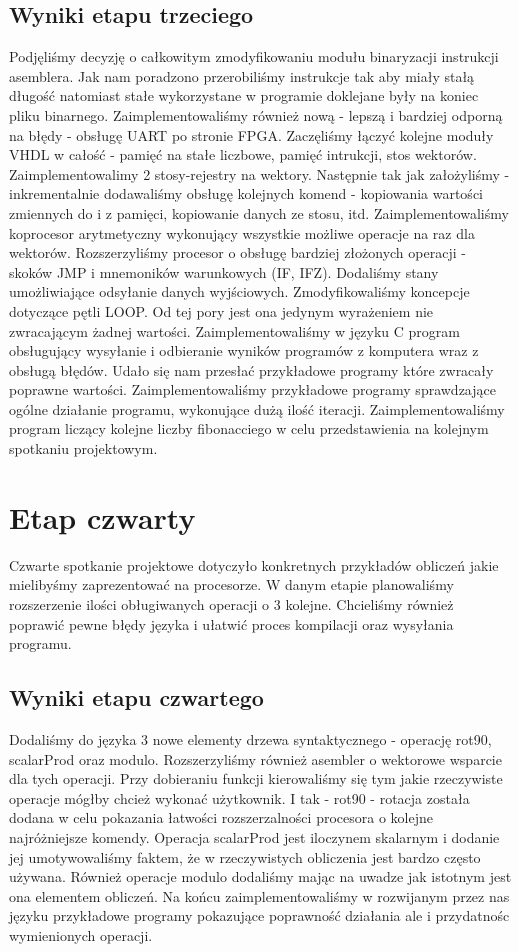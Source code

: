 \subsection{Wyniki etapu trzeciego}
Podjęliśmy decyzję o całkowitym zmodyfikowaniu modułu binaryzacji instrukcji asemblera. Jak nam poradzono przerobiliśmy instrukcje tak aby miały stałą długość natomiast stałe wykorzystane w programie doklejane były na koniec pliku binarnego. Zaimplementowaliśmy również nową - lepszą i bardziej odporną na błędy -  obsługę UART po stronie FPGA. Zaczęliśmy łączyć kolejne moduły VHDL w całość - pamięć na stałe liczbowe, pamięć intrukcji, stos wektorów. Zaimplementowalimy 2 stosy-rejestry na wektory. Następnie tak jak założyliśmy - inkrementalnie dodawaliśmy obsługę kolejnych komend - kopiowania wartości zmiennych do i z pamięci, kopiowanie danych ze stosu, itd. Zaimplementowaliśmy koprocesor arytmetyczny wykonujący wszystkie możliwe operacje na raz dla wektorów. Rozszerzyliśmy procesor o obsługę bardziej złożonych operacji - skoków JMP i mnemoników warunkowych (IF, IFZ). Dodaliśmy stany umożliwiające odsyłanie danych wyjściowych. Zmodyfikowaliśmy koncepcje dotyczące pętli LOOP. Od tej pory jest ona jedynym wyrażeniem nie zwracającym żadnej wartości. Zaimplementowaliśmy w języku C program obsługujący wysyłanie i odbieranie wyników programów z komputera wraz z obsługą błędów. Udało się nam przesłać przykładowe programy które zwracały poprawne wartości. Zaimplementowaliśmy przykładowe programy sprawdzające ogólne działanie programu, wykonujące dużą ilość iteracji. Zaimplementowaliśmy program liczący kolejne liczby fibonacciego w celu przedstawienia na kolejnym spotkaniu projektowym.
\section{Etap czwarty}
Czwarte spotkanie projektowe dotyczyło konkretnych przykładów obliczeń jakie mielibyśmy zaprezentować na procesorze. W danym etapie planowaliśmy rozszerzenie ilości obługiwanych operacji o 3 kolejne. Chcieliśmy również poprawić pewne błędy języka i ułatwić proces kompilacji oraz wysyłania programu. 
\subsection{Wyniki etapu czwartego}
Dodaliśmy do języka 3 nowe elementy drzewa syntaktycznego - operację rot90, scalarProd oraz modulo. Rozszerzyliśmy również asembler o wektorowe wsparcie dla tych operacji. Przy dobieraniu funkcji kierowaliśmy się tym jakie rzeczywiste operacje mógłby chcież wykonać użytkownik. I tak - rot90 - rotacja została dodana w celu pokazania łatwości rozszerzalności procesora o kolejne najróżniejsze komendy. Operacja scalarProd jest iloczynem skalarnym i dodanie jej umotywowaliśmy faktem, że w rzeczywistych obliczenia jest bardzo często używana. Również operacje modulo dodaliśmy mając na uwadze jak istotnym jest ona elementem obliczeń. Na końcu zaimplementowaliśmy w rozwijanym przez nas języku przykładowe programy pokazujące poprawność działania ale i przydatnośc wymienionych operacji.